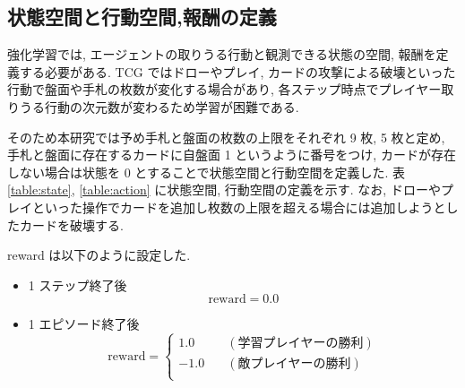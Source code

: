 \documentclass[twocolumn]{jarticle}
\begin{document}
\subsection{状態空間と行動空間,報酬の定義}
強化学習では, エージェントの取りうる行動と観測できる状態の空間, 報酬を定義する必要がある. 
TCG ではドローやプレイ, カードの攻撃による破壊といった行動で盤面や手札の枚数が変化する場合があり, 各ステップ時点でプレイヤー取りうる行動の次元数が変わるため学習が困難である.\par
そのため本研究では予め手札と盤面の枚数の上限をそれぞれ 9 枚, 5 枚と定め, 手札と盤面に存在するカードに自盤面 1 というように番号をつけ, カードが存在しない場合は状態を 0 とすることで状態空間と行動空間を定義した. 表 \ref{table:state}, \ref{table:action} に状態空間, 行動空間の定義を示す.
なお, ドローやプレイといった操作でカードを追加し枚数の上限を超える場合には追加しようとしたカードを破壊する.
\par
reward は以下のように設定した.\par
\begin{itemize}
  \vspace{-0.3cm}
  \item 1 ステップ終了後 
  \begin{equation*}
   \mathrm{reward} = 0.0  
  \end{equation*}
  \item 1 エピソード終了後
  \begin{equation*}
    \mathrm{reward} = 
    \left\{
      \begin{aligned}
          1.0 \quad & (学習プレイヤーの勝利) \\
          -1.0 \quad & (敵プレイヤーの勝利) \\
      \end{aligned}
      \right.
  \end{equation*} 
  \vspace{-0.3cm}
\end{itemize}
\end{document}

